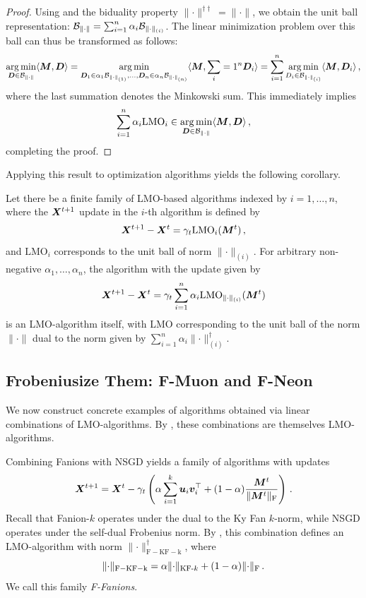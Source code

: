 \documentclass[pmlr]{jmlr}%
\newcommand{\norm}[1]{\lVert #1\rVert}
\DeclarePairedDelimiter{\normf}{\|}{\|_\mathrm{F}}
\DeclarePairedDelimiter{\normkfk}{\|}{\|_{\text{KF-}k}}
\def\<#1,#2>{\langle #1,#2\rangle}
\begin{document}
 \begin{proof}
   Using  and the biduality property $\norm{\cdot}^{\dagger \dagger} = \norm{\cdot}$, we obtain the unit ball representation: $\cB_{\norm{\cdot}} = \sum_{i = 1}^n \alpha_i \cB_{\norm{\cdot}_{(i)}}$. The linear minimization problem over this ball can thus be transformed as follows:
   \[
   \argmin_{\mD \in \cB_{\norm{\cdot}}}\<\mM, \mD> = \argmin_{\mD_1 \in \alpha_1 \cB_{\norm{\cdot}_{(1)}},\dots,\mD_n \in \alpha_n\cB_{\norm{\cdot}_{(n)}}}\<\mM, \sum_{i = 1}^n\mD_i> = \sum_{i = 1}^n \argmin_{D_i \in \cB_{\norm{\cdot}_{(i)}}}\<\mM, \mD_i>\,,
   \]
   where the last summation denotes the Minkowski sum. This immediately implies 
   \[
   \sum_{i = 1}^n \alpha_i \mathrm{LMO}_{i} \in \argmin_{\mD \in \cB_{\norm{\cdot}}}\<\mM, \mD>\,,
   \] 
   completing the proof.
 \end{proof}
 
 Applying this result to optimization algorithms yields the following corollary.
 
 \begin{corollary}\label{corollary:lin_comb_alg}
   Let there be a finite family of LMO-based algorithms indexed by $i = 1,\dots,n$, where the ${\bm{X}}^{t + 1}$ update in the $i$-th algorithm is defined by
   \[
   {\bm{X}}^{t + 1} - {\bm{X}}^{t} = \gamma_t \mathrm{LMO}_{i}({\bm{M}}^{t})\,,
   \]
   and $\mathrm{LMO}_i$ corresponds to the unit ball of norm $\norm{\cdot}_{(i)}$. For arbitrary non-negative $\alpha_1,\dots,\alpha_n$, the algorithm with the update given by
   \[
   \mX^{t + 1} - \mX^{t} = \gamma_t \sum_{i = 1}^n \alpha_i \mathrm{LMO}_{\norm{\cdot}_{(i)}}(\mM^t)
   \]
   is an LMO-algorithm itself, with LMO corresponding to the unit ball of the norm $\norm{\cdot}$ dual to the norm given by $\sum_{i = 1}^n \alpha_i \norm{\cdot}_{(i)}^\dagger$.
 \end{corollary}
 
 \subsection{Frobeniusize Them: F-Muon and F-Neon}
 We now construct concrete examples of algorithms obtained via linear combinations of LMO-algorithms. By , these combinations are themselves LMO-algorithms.
 
 Combining Fanions with NSGD yields a family of algorithms with updates
 \begin{equation}\label{eq:nsgd_muon_update}
     \mX^{t+1} = \mX^{t} - \gamma_t \left(\alpha \sum_{i = 1}^k \vu_i \vv_i^\top + (1-\alpha)\frac{\mM^t}{\normf{\mM^t}}\right)\,.
 \end{equation}
 Recall that Fanion-$k$ operates under the dual to the Ky Fan $k$-norm, while NSGD operates under the self-dual Frobenius norm. By , this combination defines an LMO-algorithm with norm $\norm{\cdot}_{\mathrm{F-KF-k}}^\dagger$, where
 \begin{equation}\label{eq:fkfk_norm}
   \norm{\cdot}_{\mathrm{F-KF-k}} = \alpha \normkfk{\cdot} + (1-\alpha)\normf{\cdot}\,.
 \end{equation}
 We call this family \emph{F-Fanions}.
 
\end{document}
